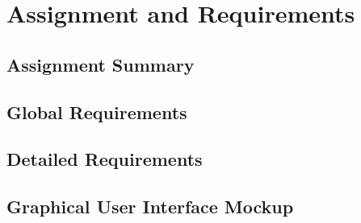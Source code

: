 \chapter{Assignment and Requirements}

\section{Assignment Summary}

\section{Global Requirements}

\section{Detailed Requirements}

\section{Graphical User Interface Mockup}
